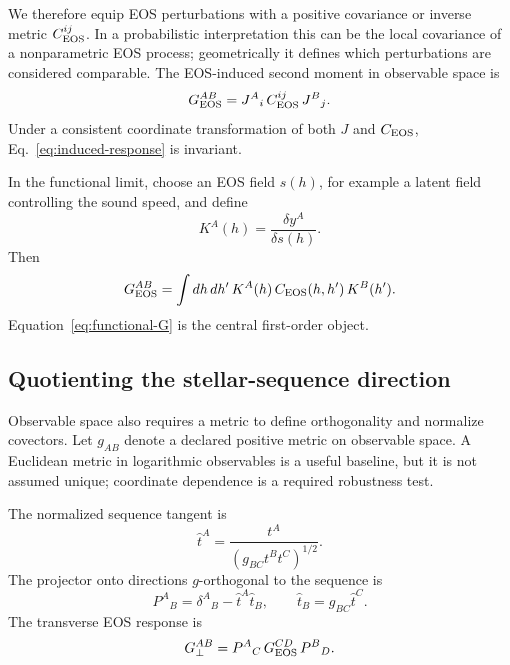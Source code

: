 We therefore equip EOS perturbations with a positive covariance or inverse metric \(C_{\rm EOS}^{ij}\). In a probabilistic interpretation this can be the local covariance of a nonparametric EOS process; geometrically it defines which perturbations are considered comparable. The EOS-induced second moment in observable space is
\begin{equation}
    G_{\rm EOS}^{AB}
    =
    J^A{}_i\,C_{\rm EOS}^{ij}\,J^B{}_j .
    \label{eq:induced-response}
\end{equation}
Under a consistent coordinate transformation of both \(J\) and \(C_{\rm EOS}\), Eq.~\eqref{eq:induced-response} is invariant.

In the functional limit, choose an EOS field \(s(h)\), for example a latent field controlling the sound speed, and define
\begin{equation}
    K^A(h)
    =
    \frac{\delta y^A}{\delta s(h)} .
    \label{eq:functional-kernel}
\end{equation}
Then
\begin{equation}
    G_{\rm EOS}^{AB}
    =
    \int dh\,dh'\,
    K^A(h)\,
    C_{\rm EOS}(h,h')\,
    K^B(h') .
    \label{eq:functional-G}
\end{equation}
Equation~\eqref{eq:functional-G} is the central first-order object.

\subsection{Quotienting the stellar-sequence direction}

Observable space also requires a metric to define orthogonality and normalize covectors. Let \(g_{AB}\) denote a declared positive metric on observable space. A Euclidean metric in logarithmic observables is a useful baseline, but it is not assumed unique; coordinate dependence is a required robustness test.

The normalized sequence tangent is
\begin{equation}
    \hat t^A
    =
    \frac{t^A}{(g_{BC}t^Bt^C)^{1/2}} .
\end{equation}
The projector onto directions \(g\)-orthogonal to the sequence is
\begin{equation}
    P^A{}_B
    =
    \delta^A{}_B
    -
    \hat t^A \hat t_B ,
    \qquad
    \hat t_B=g_{BC}\hat t^C .
    \label{eq:projector}
\end{equation}
The transverse EOS response is
\begin{equation}
    G_{\perp}^{AB}
    =
    P^A{}_C\,
    G_{\rm EOS}^{CD}\,
    P^B{}_D .
    \label{eq:Gperp}
\end{equation}

